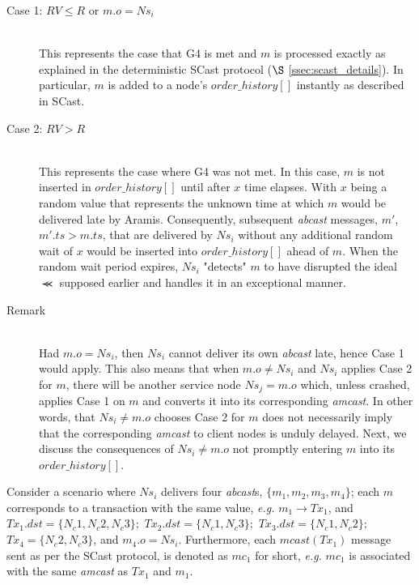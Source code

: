     \begin{description}
        \item[Case 1: $RV \leq R$ \textnormal{or} $m.o = Ns_i$]\hfill \\
        This represents the case that G4 is met and $m$ is processed exactly as explained in the deterministic \textsf{SCast} protocol ($\S$ \ref{ssec:scast_details}).  In particular, $m$ is added to a node's $order\_history[]$ instantly as described in \textsf{SCast}.  
        
        \item[Case 2: $RV > R$]\hfill \\
        This represents the case where G4 was not met.  In this case, $m$ is not inserted in $order\_history[]$ until after $x$ time elapses. With $x$ being a random value that represents the unknown time at which $m$ would be delivered late by \textsf{Aramis}.  Consequently, subsequent \emph{abcast} messages, $m'$, $m'.ts > m.ts$, that are delivered by $Ns_i$ without any additional random wait of $x$ would be inserted into $order\_history[]$ ahead of $m$.  When the random wait period expires, $Ns_i$ "detects" $m$ to have disrupted the ideal $\llcurly$ supposed earlier and handles it in an exceptional manner.  
    \end{description}
    
    \begin{description}
    \item[Remark] \hfill \\
    Had $m.o = Ns_i$, then $Ns_i$ cannot deliver its own \emph{abcast} late, hence Case 1 would apply.  This also means that when $m.o \neq Ns_i$ and $Ns_i$ applies Case 2 for $m$, there will be another service node $Ns_j = m.o$ which, unless crashed, applies Case 1 on $m$ and converts it into its corresponding \emph{amcast}.  In other words, that $Ns_i \neq m.o$ chooses Case 2 for $m$ does not necessarily imply that the corresponding \emph{amcast} to client nodes is unduly delayed.  Next, we discuss the consequences of $Ns_i \neq m.o$ not promptly entering $m$ into its $order\_history[]$.
    \end{description}
    
    Consider a scenario where $Ns_i$ delivers four \emph{abcast}s, $\{m_1, m_2, m_3, m_4\}$; each $m$ corresponds to a transaction with the same value, \emph{e.g.} $m_1 \rightarrow Tx_1$, and $Tx_1.dst = \{N_c1, N_c2, N_c3\};$ $Tx_2.dst = \{N_c1, N_c3\};$ $Tx_3.dst = \{N_c1, N_c2\};$ $Tx_4 = \{N_c2, N_c3\}$, and $m_4.o = Ns_i$.  Furthermore, each $mcast(Tx_1)$ message sent as per the \textsf{SCast} protocol, is denoted as $mc_1$ for short, \emph{e.g.} $mc_1$ is associated with the same \emph{amcast} as $Tx_1$ and $m_1$.  
    
